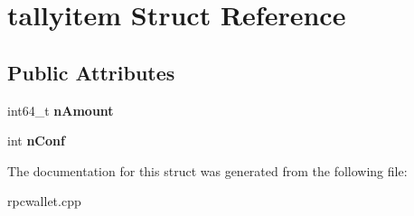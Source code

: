 \hypertarget{structtallyitem}{}\section{tallyitem Struct Reference}
\label{structtallyitem}
\subsection*{Public Attributes}
\begin{DoxyCompactItemize}
\item 
\mbox{\label{structtallyitem_a35a17b5fa2b8558ea157e4651be9d6c0}} 
int64\+\_\+t {\bfseries n\+Amount}
\item 
\mbox{\label{structtallyitem_a3b2facf2b1290561c5eabb22bc26c22d}} 
int {\bfseries n\+Conf}
\end{DoxyCompactItemize}


The documentation for this struct was generated from the following file\+:\begin{DoxyCompactItemize}
\item 
rpcwallet.\+cpp\end{DoxyCompactItemize}
